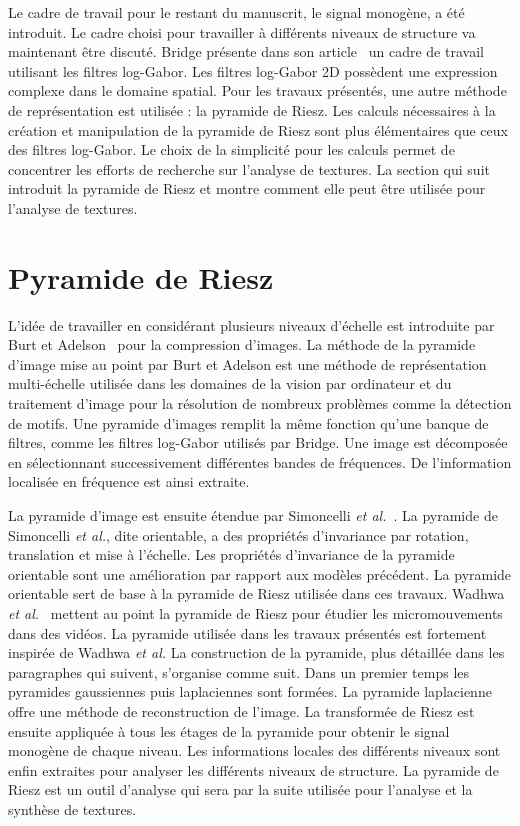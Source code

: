 \bigskip

Le cadre de travail pour le restant du manuscrit, le signal monogène, a été introduit. Le cadre choisi pour travailler à différents niveaux de structure va maintenant être discuté. Bridge présente dans son article~\cite{bridge_introduction_2018} un cadre de travail utilisant les filtres log-Gabor. Les filtres log-Gabor 2D possèdent une expression complexe dans le domaine spatial. Pour les travaux présentés, une autre méthode de représentation est utilisée : la pyramide de Riesz. Les calculs nécessaires à la création et manipulation de la pyramide de Riesz sont plus élémentaires que ceux des filtres log-Gabor. Le choix de la simplicité pour les calculs permet de concentrer les efforts de recherche sur l'analyse de textures. La section qui suit introduit la pyramide de Riesz et montre comment elle peut être utilisée pour l'analyse de textures.

\section{Pyramide de Riesz}

L'idée de travailler en considérant plusieurs niveaux d'échelle est introduite par Burt et Adelson~\cite{burt_laplacian_1983} pour la compression d'images. La méthode de la pyramide d'image mise au point par Burt et Adelson est une méthode de représentation multi-échelle utilisée dans les domaines de la vision par ordinateur et du traitement d'image pour la résolution de nombreux problèmes comme la détection de motifs. Une pyramide d'images remplit la même fonction qu'une banque de filtres, comme les filtres log-Gabor utilisés par Bridge. Une image est décomposée en sélectionnant successivement différentes bandes de fréquences. De l'information localisée en fréquence est ainsi extraite.

\bigskip

La pyramide d'image est ensuite étendue par Simoncelli \textit{et al.}~\cite{simoncelli_shiftable_1992}. La pyramide de Simoncelli \textit{et al.}, dite orientable, a des propriétés d'invariance par rotation, translation et mise à l'échelle. Les propriétés d'invariance de la pyramide orientable sont une amélioration par rapport aux modèles précédent. La pyramide orientable sert de base à la pyramide de Riesz utilisée dans ces travaux. Wadhwa \textit{et al.}~\cite{wadhwa_phase_based_2013} mettent au point la pyramide de Riesz pour étudier les micromouvements dans des vidéos. La pyramide utilisée dans les travaux présentés est fortement inspirée de Wadhwa \textit{et al.} La construction de la pyramide, plus détaillée dans les paragraphes qui suivent, s'organise comme suit. Dans un premier temps les pyramides gaussiennes puis laplaciennes sont formées. La pyramide laplacienne offre une méthode de reconstruction de l'image. La transformée de Riesz est ensuite appliquée à tous les étages de la pyramide pour obtenir le signal monogène de chaque niveau. Les informations locales des différents niveaux sont enfin extraites pour analyser les différents niveaux de structure. La pyramide de Riesz est un outil d'analyse qui sera par la suite utilisée pour l'analyse et la synthèse de textures.

